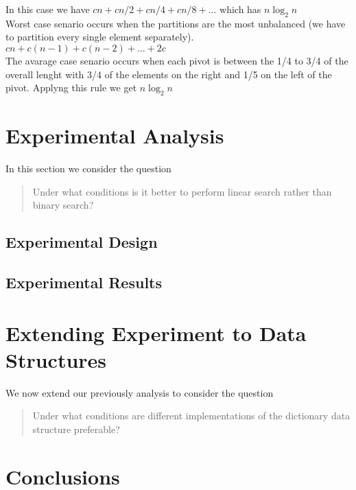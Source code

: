 \documentclass{article}
\begin{document}
In this case we have
$cn + cn/2 + cn/4 + cn/8 + ...$
which has $n\log_{2}n$ \\

  Worst case senario occurs when the partitions are the most unbalanced (we have to partition every single element separately).
$cn + c(n-1) + c(n-2) + ... + 2c$ \\

  The avarage case senario occurs when each pivot is between the 1/4 to 3/4 of the overall lenght with
3/4 of the elements on the right and 1/5 on the left of the pivot. Applyng this rule we get 
$n\log_{2}n$

\section{Experimental Analysis}
\label{sec:initialExperiments}

In this section we consider the question
	\begin{quote}
	Under what conditions is it better to perform linear search rather than binary search?
	\end{quote}

\subsection{Experimental Design}

\subsection{Experimental Results}



\section{Extending Experiment to Data Structures}
\label{sec:part3}

We now extend our previously analysis to consider the question
\begin{quote}
Under what conditions are different implementations of the dictionary data structure preferable?
\end{quote}

\section{Conclusions}
\label{sec:conclusions}
\end{document}
